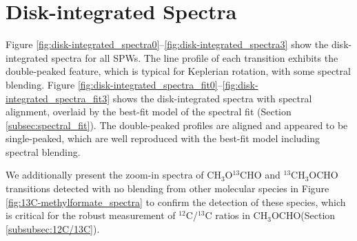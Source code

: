 \documentclass[linenumbers, twocolumn, twocolappendix, astrosymb, times]{aastex631}
\newcommand{\methylformate}{CH$_3$OCHO\xspace}
\begin{document}





\section{Disk-integrated Spectra}\label{appendix:spectra}
Figure \ref{fig:disk-integrated_spectra0}--\ref{fig:disk-integrated_spectra3} show the disk-integrated spectra for all SPWs. The line profile of each transition exhibits the double-peaked feature, which is typical for Keplerian rotation, with some spectral blending. Figure \ref{fig:disk-integrated_spectra_fit0}--\ref{fig:disk-integrated_spectra_fit3} shows the disk-integrated spectra with spectral alignment, overlaid by the best-fit model of the spectral fit (Section \ref{subsec:spectral_fit}). The double-peaked profiles are aligned and appeared to be single-peaked, which are well reproduced with the best-fit model including spectral blending. 

\textrm{We additionally present the zoom-in spectra of CH$_3$O$^{13}$CHO and $^{13}$CH$_3$OCHO transitions detected with no blending from other molecular species in Figure \ref{fig:13C-methylformate_spectra} to confirm the detection of these species, which is critical for the robust measurement of $^{12}$C/$^{13}$C ratios in \methylformate (Section \ref{subsubsec:12C/13C}).}

\begin{figure*}
\caption{Disk-integrated spectra toward V883 Ori without spectral alignment. The emission is integrated over the deprojected disk region with the outer radius of 0 (or 240 au).}
\label{fig:disk-integrated_spectra0}
\end{figure*}

\begin{figure*}
\caption{Continuation of Figure \ref{fig:disk-integrated_spectra0}.}
\label{fig:disk-integrated_spectra1}
\end{figure*}
\end{document}
